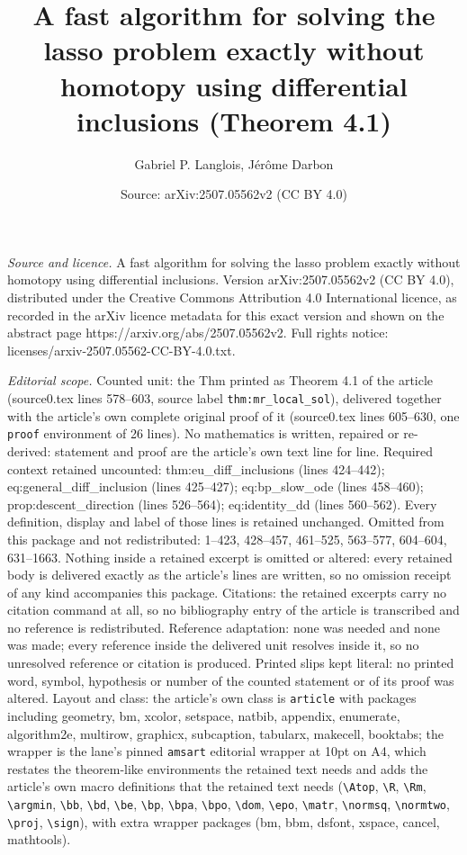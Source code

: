 \documentclass[10pt,a4paper]{amsart}
\title[A fast algorithm for solving the lasso problem exactly witho]{A fast algorithm for solving the lasso problem exactly without homotopy using differential inclusions (Theorem 4.1)}
\author{Gabriel P. Langlois, J\'er\^ome Darbon}
\date{Source: arXiv:2507.05562v2 (CC BY 4.0)}
\begin{document}
\maketitle

\noindent\emph{Source and licence.} A fast algorithm for solving the lasso problem exactly without homotopy using differential inclusions. Version arXiv:2507.05562v2 (CC BY 4.0), distributed under the Creative Commons Attribution 4.0 International licence, as recorded in the arXiv licence metadata for this exact version and shown on the abstract page https://arxiv.org/abs/2507.05562v2. Full rights notice: licenses/arxiv-2507.05562-CC-BY-4.0.txt.\par\smallskip

\noindent\textit{Editorial scope.} Counted unit: the Thm printed as Theorem 4.1 of the article (source0.tex lines 578--603, source label \texttt{thm:mr\_local\_sol}), delivered together with the article's own complete original proof of it (source0.tex lines 605--630, one \texttt{proof} environment of 26 lines). No mathematics is written, repaired or re-derived: statement and proof are the article's own text line for line. Required context retained uncounted: thm:eu\_diff\_inclusions (lines 424--442); eq:general\_diff\_inclusion (lines 425--427); eq:bp\_slow\_ode (lines 458--460); prop:descent\_direction (lines 526--564); eq:identity\_dd (lines 560--562). Every definition, display and label of those lines is retained unchanged. Omitted from this package and not redistributed: 1--423, 428--457, 461--525, 563--577, 604--604, 631--1663. Nothing inside a retained excerpt is omitted or altered: every retained body is delivered exactly as the article's lines are written, so no omission receipt of any kind accompanies this package. Citations: the retained excerpts carry no citation command at all, so no bibliography entry of the article is transcribed and no reference is redistributed. Reference adaptation: none was needed and none was made; every reference inside the delivered unit resolves inside it, so no unresolved reference or citation is produced. Printed slips kept literal: no printed word, symbol, hypothesis or number of the counted statement or of its proof was altered. Layout and class: the article's own class is \texttt{article} with packages including geometry, bm, xcolor, setspace, natbib, appendix, enumerate, algorithm2e, multirow, graphicx, subcaption, tabularx, makecell, booktabs; the wrapper is the lane's pinned \texttt{amsart} editorial wrapper at 10pt on A4, which restates the theorem-like environments the retained text needs and adds the article's own macro definitions that the retained text needs (\texttt{\textbackslash Atop}, \texttt{\textbackslash R}, \texttt{\textbackslash Rm}, \texttt{\textbackslash argmin}, \texttt{\textbackslash bb}, \texttt{\textbackslash bd}, \texttt{\textbackslash be}, \texttt{\textbackslash bp}, \texttt{\textbackslash bpa}, \texttt{\textbackslash bpo}, \texttt{\textbackslash dom}, \texttt{\textbackslash epo}, \texttt{\textbackslash matr}, \texttt{\textbackslash normsq}, \texttt{\textbackslash normtwo}, \texttt{\textbackslash proj}, \texttt{\textbackslash sign}), with extra wrapper packages (bm, bbm, dsfont, xspace, cancel, mathtools). 
\end{document}
